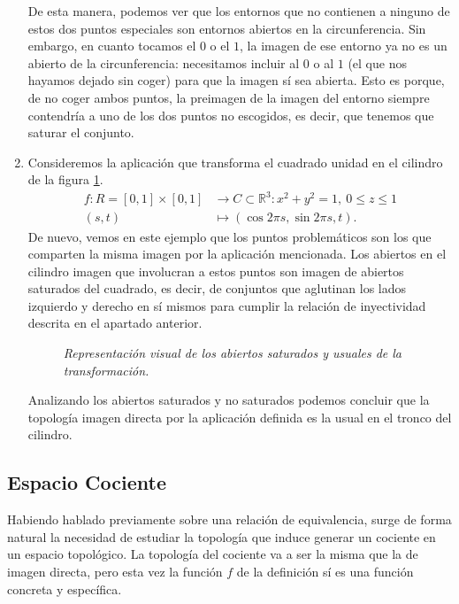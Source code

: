 \begin{ej}
\begin{enumerate}
    De esta manera, podemos ver que los entornos que no contienen a ninguno de estos dos puntos especiales son entornos abiertos en la circunferencia. Sin embargo, en cuanto tocamos el $0$ o el $1$, la imagen de ese entorno ya no es un abierto de la circunferencia: necesitamos incluir al $0$ o al $1$ (el que nos hayamos dejado sin coger) para que la imagen sí sea abierta. Esto es porque, de no coger ambos puntos, la preimagen de la imagen del entorno siempre contendría a uno de los dos puntos no escogidos, es decir, que tenemos que saturar el conjunto.
    \item Consideremos la aplicación que transforma el cuadrado unidad en el cilindro de la figura \ref{fig:rect-a-cilindro-por-imagen-directa.}.
    \begin{align*}
        f: R = \left[ 0, 1 \right] \times \left[ 0, 1 \right] &\rightarrow C \subset \mathbb{R}^3: x^2 + y^2 = 1,\ 0 \le z \le 1\\
        \left( s, t \right) &\mapsto \left( \cos 2\pi s, \sin 2\pi s, t \right) 
    .\end{align*}
    De nuevo, vemos en este ejemplo que los puntos problemáticos son los que comparten la misma imagen por la aplicación mencionada. Los abiertos en el cilindro imagen que involucran a estos puntos son imagen de abiertos saturados del cuadrado, es decir, de conjuntos que aglutinan los lados izquierdo y derecho en sí mismos para cumplir la relación de inyectividad descrita en el apartado anterior.  
    \begin{figure}[H]
        \centering
        \caption{\textit{Representación visual de los abiertos saturados y usuales de la transformación.}}
        \label{fig:rect-a-cilindro-por-imagen-directa.}
    \end{figure}
    Analizando los abiertos saturados y no saturados podemos concluir que la topología imagen directa por la aplicación definida es la usual en el tronco del cilindro.
\end{enumerate}
\end{ej}

\subsection{Espacio Cociente}
\label{sub:cocientes}

Habiendo hablado previamente sobre una relación de equivalencia, surge de forma natural la necesidad de estudiar la topología que induce generar un cociente en un espacio topológico. La topología del cociente va a ser la misma que la de imagen directa, pero esta vez la función $f$ de la definición sí es una función concreta y específica.

